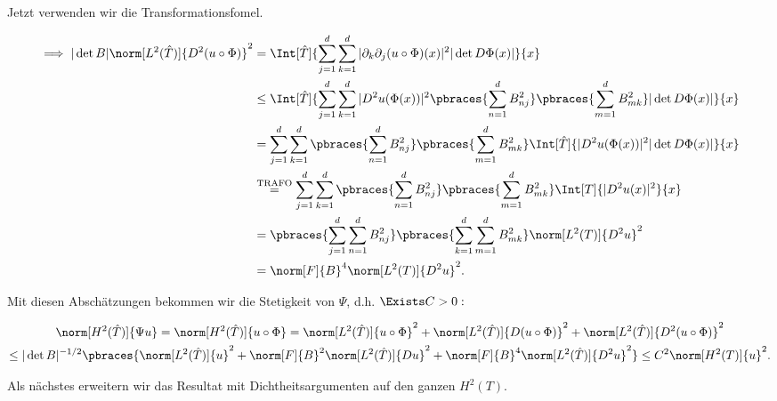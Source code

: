 \begin{solution}
\begin{enumerate}[label = \arabic*.]
  Jetzt verwenden wir die Transformationsfomel.

  \begin{align*}
    \implies
    |\det B| \norm[L^2(\hat T)]{D^2(u\circ\Phi)}^2
    & =
    \Int[\hat T]
    {
      \sum_{j=1}^d
      \sum_{k=1}^d
      |\partial_k \partial_j (u \circ \Phi)(x)|^2
      |\det D\Phi(x)|
    }{x} \\
    & \leq
    \Int[\hat T]
    {
      \sum_{j=1}^d
      \sum_{k=1}^d
      |D^2 u (\Phi(x))|^2
      \pbraces
      {
        \sum_{n=1}^d
        B_{nj}^2
      }
      \pbraces
      {
        \sum_{m=1}^d
        B_{mk}^2
      }
      |\det D \Phi(x)|
    }{x} \\
    & =
    \sum_{j=1}^d
    \sum_{k=1}^d
    \pbraces
    {
      \sum_{n=1}^d
      B_{nj}^2
    }
    \pbraces
    {
      \sum_{m=1}^d
      B_{mk}^2
    }
    \Int[\hat T]
    {
      |D^2 u (\Phi(x))|^2
      |\det D \Phi(x)|
    }{x} \\
    & \stackrel
    {
      \mathrm{TRAFO}
    }{=}
    \sum_{j=1}^d
    \sum_{k=1}^d
    \pbraces
    {
      \sum_{n=1}^d
      B_{nj}^2
    }
    \pbraces
    {
      \sum_{m=1}^d
      B_{mk}^2
    }
    \Int[T]{|D^2 u(x)|^2}{x} \\
    & =
    \pbraces
    {
      \sum_{j=1}^d
      \sum_{n=1}^d
      B_{nj}^2
    }
    \pbraces
    {
      \sum_{k=1}^d
      \sum_{m=1}^d
      B_{mk}^2
    }
    \norm[L^2(T)]{D^2 u}^2 \\
    & =
    \norm[F]{B}^4 \norm[L^2(T)]{D^2 u}^2.
  \end{align*}

\end{enumerate}

Mit diesen Abschätzungen bekommen wir die Stetigkeit von $\Psi$, d.h. $\Exists C > 0:$

\begin{multline*}
  \norm[H^2(\hat T)]{\Psi u}
  =
  \norm[H^2(\hat T)]{u \circ \Phi}
  =
  \norm[L^2(\hat T)]{u \circ \Phi}^2
  +
  \norm[L^2(\hat T)]{D (u \circ \Phi)}^2
  +
  \norm[L^2(\hat T)]{D^2 (u \circ \Phi)}^2 \\
  \leq
  |\det B|^{-1/2}
  \pbraces
  {
    \norm[L^2(\hat T)]{u}^2
    +
    \norm[F]{B}^2
    \norm[L^2(\hat T)]{Du}^2
    +
    \norm[F]{B}^4
    \norm[L^2(\hat T)]{D^2 u}^2
  }
  \leq
  C^2 \norm[H^2(T)]{u}^2.
\end{multline*}

Als nächstes erweitern wir das Resultat mit Dichtheitsargumenten auf den ganzen $H^2(T)$.


\end{solution}
